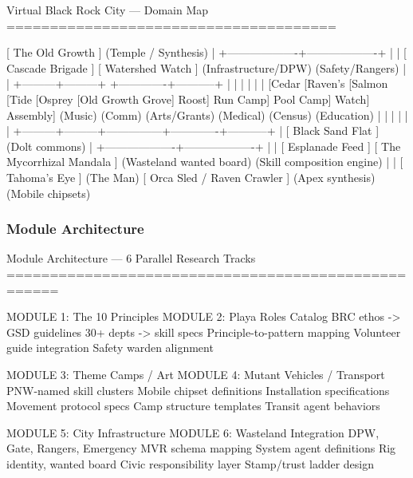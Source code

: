 \documentclass[11pt,letterpaper]{article}
\begin{document}
\begin{asciibox}
Virtual Black Rock City --- Domain Map
======================================

                        [ The Old Growth ]
                           (Temple / Synthesis)
                                  |
              +-------------------+-------------------+
              |                                       |
    [ Cascade Brigade ]                    [ Watershed Watch ]
    (Infrastructure/DPW)                  (Safety/Rangers)
              |                                       |
    +---------+---------+               +-------------+-----------+
    |         |         |               |             |           |
[Cedar    [Raven's  [Salmon         [Tide         [Osprey    [Old Growth
 Grove]    Roost]    Run Camp]       Pool Camp]    Watch]     Assembly]
(Music)   (Comm)    (Arts/Grants)   (Medical)     (Census)   (Education)
    |         |         |               |             |           |
    +---------+---------+---------------+-------------+-----------+
                                  |
                         [ Black Sand Flat ]
                           (Dolt commons)
                                  |
              +-------------------+-------------------+
              |                                       |
    [ Esplanade Feed ]                       [ The Mycorrhizal Mandala ]
    (Wasteland wanted board)                  (Skill composition engine)
              |                                       |
    [ Tahoma's Eye ]         (The Man)        [ Orca Sled / Raven Crawler ]
    (Apex synthesis)                           (Mobile chipsets)
\end{asciibox}

\subsubsection{Module Architecture}

\begin{asciibox}
Module Architecture --- 6 Parallel Research Tracks
====================================================

MODULE 1: The 10 Principles          MODULE 2: Playa Roles Catalog
  BRC ethos -> GSD guidelines          30+ depts -> skill specs
  Principle-to-pattern mapping         Volunteer guide integration
  Safety warden alignment

MODULE 3: Theme Camps / Art           MODULE 4: Mutant Vehicles / Transport
  PNW-named skill clusters              Mobile chipset definitions
  Installation specifications           Movement protocol specs
  Camp structure templates              Transit agent behaviors

MODULE 5: City Infrastructure         MODULE 6: Wasteland Integration
  DPW, Gate, Rangers, Emergency         MVR schema mapping
  System agent definitions              Rig identity, wanted board
  Civic responsibility layer            Stamp/trust ladder design
\end{asciibox}
\end{document}
